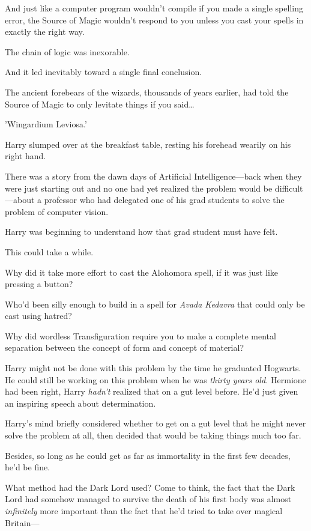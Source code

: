 And just like a computer program wouldn't compile if you made a single spelling 
error, the Source of Magic wouldn't respond to you unless you cast your spells 
in exactly the right way.

The chain of logic was inexorable.

And it led inevitably toward a single final conclusion.

The ancient forebears of the wizards, thousands of years earlier, had told the 
Source of Magic to only levitate things if you said{\ldots}

'Wingardium Leviosa.'

Harry slumped over at the breakfast table, resting his forehead wearily on his 
right hand.

There was a story from the dawn days of Artificial Intelligence---back when 
they were just starting out and no one had yet realized the problem would be 
difficult---about a professor who had delegated one of his grad students to 
solve the problem of computer vision.

Harry was beginning to understand how that grad student must have felt.

This could take a while.

Why did it take more effort to cast the Alohomora spell, if it was just like 
pressing a button?

Who'd been silly enough to build in a spell for \emph{Avada Kedavra} that could 
only be cast using hatred?

Why did wordless Transfiguration require you to make a complete mental 
separation between the concept of form and concept of material?

Harry might not be done with this problem by the time he graduated Hogwarts. He 
could still be working on this problem when he was \emph{thirty years old.} 
Hermione had been right, Harry \emph{hadn't} realized that on a gut level 
before. He'd just given an inspiring speech about determination.

Harry's mind briefly considered whether to get on a gut level that he might 
never solve the problem at all, then decided that would be taking things much 
too far.

Besides, so long as he could get as far as immortality in the first few 
decades, he'd be fine.

What method had the Dark Lord used? Come to think, the fact that the Dark Lord 
had somehow managed to survive the death of his first body was almost 
\emph{infinitely} more important than the fact that he'd tried to take over 
magical Britain---

